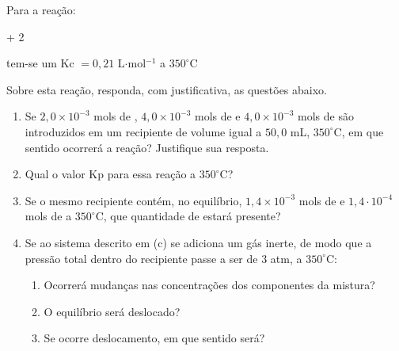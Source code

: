 Para a reação:
\begin{center}
	 +  \arrow{->} 2    
	\schemestop
\end{center}

tem-se um Kc $= 0,21$ L$\cdot$mol$^{-1}$ a $350 ^\circ$C

Sobre esta reação, responda, com justificativa, as questões abaixo.

\begin{enumerate}[label = (\alph*)]
	\item Se $2,0 \times 10^{-3}$ mols de , $4,0 \times 10^{-3}$ mols de  e $4,0 \times 10^{-3}$ mols de  são introduzidos em um recipiente de volume igual a $50,0$ mL, $350 ^\circ$C, em que sentido ocorrerá a reação? Justifique sua resposta.
	\item Qual o valor Kp para essa reação a $350 ^\circ$C?
	\item Se o mesmo recipiente contém, no equilíbrio, $1,4 \times 10^{-3}$ mols de  e $1,4 \cdot 10^{-4}$ mols de  a $350 ^\circ$C, que quantidade de  estará presente?
	\item Se ao sistema descrito em (c) se adiciona um gás inerte, de modo que a pressão total dentro do recipiente passe a ser de $3$ atm, a $350 ^\circ$C:
		\begin{enumerate}[label = (d.\roman*)]
			\item Ocorrerá mudanças nas concentrações dos componentes da mistura?
			\item O equilíbrio será deslocado?
			\item Se ocorre deslocamento, em que sentido será?
		\end{enumerate}
\end{enumerate}
